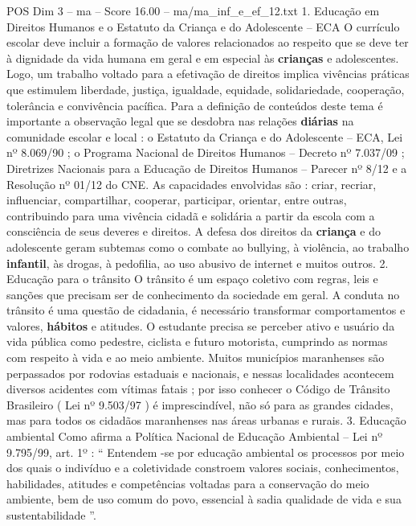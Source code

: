 \begin{textsample}{POS Dim 3 – ma – Score 16.00 – ma/ma\_inf\_e\_ef\_12.txt}  \label{ex:f3_pos_149}
1.
Educação em Direitos Humanos e o Estatuto da Criança e do Adolescente – ECA O currículo escolar deve incluir a formação de valores relacionados ao respeito que se deve ter à dignidade da vida humana em geral e em especial às \textbf{crianças} e adolescentes.
Logo, um trabalho voltado para a efetivação de direitos implica vivências práticas que estimulem liberdade, justiça, igualdade, equidade, solidariedade, cooperação, tolerância e convivência pacífica.
Para a definição de conteúdos deste tema é importante a observação legal que se desdobra nas relações \textbf{diárias} na comunidade escolar e local : o Estatuto da Criança e do Adolescente – ECA, Lei nº 8.069/90 ; o Programa Nacional de Direitos Humanos – Decreto nº 7.037/09 ; Diretrizes Nacionais para a Educação de Direitos Humanos – Parecer nº 8/12 e a Resolução nº 01/12 do CNE.
As capacidades envolvidas são : criar, recriar, influenciar, compartilhar, cooperar, participar, orientar, entre outras, contribuindo para uma vivência cidadã e solidária a partir da escola com a consciência de seus deveres e direitos.
A defesa dos direitos da \textbf{criança} e do adolescente geram subtemas como o combate ao bullying, à violência, ao trabalho \textbf{infantil}, às drogas, à pedofilia, ao uso abusivo de internet e muitos outros. 2.
Educação para o trânsito O trânsito é um espaço coletivo com regras, leis e sanções que precisam ser de conhecimento da sociedade em geral.
A conduta no trânsito é uma questão de cidadania, é necessário transformar comportamentos e valores, \textbf{hábitos} e atitudes.
O estudante precisa se perceber ativo e usuário da vida pública como pedestre, ciclista e futuro motorista, cumprindo as normas com respeito à vida e ao meio ambiente.
Muitos municípios maranhenses são perpassados por rodovias estaduais e nacionais, e nessas localidades acontecem diversos acidentes com vítimas fatais ; por isso conhecer o Código de Trânsito Brasileiro ( Lei nº 9.503/97 ) é imprescindível, não só para as grandes cidades, mas para todos os cidadãos maranhenses nas áreas urbanas e rurais. 3.
Educação ambiental Como afirma a Política Nacional de Educação Ambiental – Lei nº 9.795/99, art. 1º : “ Entendem -se por educação ambiental os processos por meio dos quais o indivíduo e a coletividade constroem valores sociais, conhecimentos, habilidades, atitudes e competências voltadas para a conservação do meio ambiente, bem de uso comum do povo, essencial à sadia qualidade de vida e sua sustentabilidade ”.

\end{textsample}
